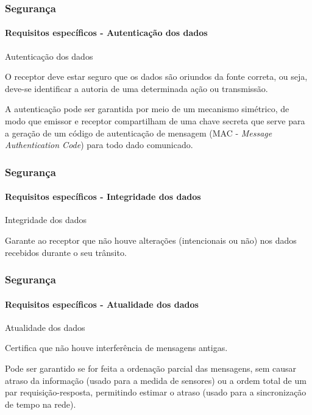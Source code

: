 \documentclass[notes]{beamer}
\begin{document}
\begin{frame}
\label{slide_72}
\frametitle{Segurança}
\framesubtitle{Requisitos específicos - Autenticação dos dados}

\begin{block}{Autenticação dos dados}

O receptor deve estar seguro que os dados são oriundos da fonte correta, ou seja, deve-se identificar a autoria de uma determinada ação ou transmissão. 

\end{block} \pause

\begin{block}

A autenticação pode ser garantida por meio de um mecanismo simétrico, de modo que emissor e receptor compartilham de uma chave secreta que serve para a geração de um código de autenticação de mensagem (MAC - \textit{Message Authentication Code}) para todo dado comunicado.

\end{block} 

\end{frame}

\begin{frame}
\label{slide_73}
\frametitle{Segurança}
\framesubtitle{Requisitos específicos - Integridade dos dados}

\begin{block}{Integridade dos dados}

Garante ao receptor que não houve alterações (intencionais ou não) nos dados recebidos durante o seu trânsito. 

\end{block} 

\end{frame}

\begin{frame}
\label{slide_74}
\frametitle{Segurança}
\framesubtitle{Requisitos específicos - Atualidade dos dados}

\begin{block}{Atualidade dos dados}

Certifica que não houve interferência de mensagens antigas.

\end{block} \pause

\begin{block}

Pode ser garantido se for feita a ordenação parcial das mensagens, sem causar atraso da informação (usado para a medida de sensores) ou a ordem total de um par requisição-resposta, permitindo estimar o atraso (usado para a sincronização de tempo na rede).  

\end{block} 

\end{frame}
\end{document}
